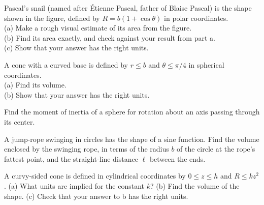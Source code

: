 \begin{hwsection}

\begin{hw}\label{hw:snail}
Pascal's snail (named after \'{E}tienne Pascal, father of Blaise Pascal)
is the shape shown in the figure, defined by $R=b(1+\cos\theta)$ in polar coordinates.\\
(a) Make a rough visual estimate of its area from the figure.\\
(b) Find its area exactly, and check against your result from part a.\\
(c) Show that your answer has the right units.\thompson
\end{hw}


\begin{hw}
A cone with a curved base is defined by $r\le b$ and $\theta\le \pi/4$ in spherical
coordinates.\\
(a) Find its volume.\\
(b) Show that your answer has the right units.
\end{hw}

\begin{hw}
Find the moment of inertia of a sphere for rotation about an axis passing through its center.
\end{hw}

\begin{hw}
A jump-rope swinging in circles has the shape of a sine function. Find the volume enclosed by
the swinging rope, in terms of the radius $b$ of the circle at the rope's fattest point, and
the straight-line distance $\ell$ between the ends.
\end{hw}

\begin{hw}
A curvy-sided cone is defined in cylindrical coordinates by $0\le z\le h$ and
$R\le kz^2$. (a) What units are implied for the constant $k$? (b) Find the volume
of the shape. (c) Check that your answer to b has the right units.
\end{hw}


\end{hwsection}

